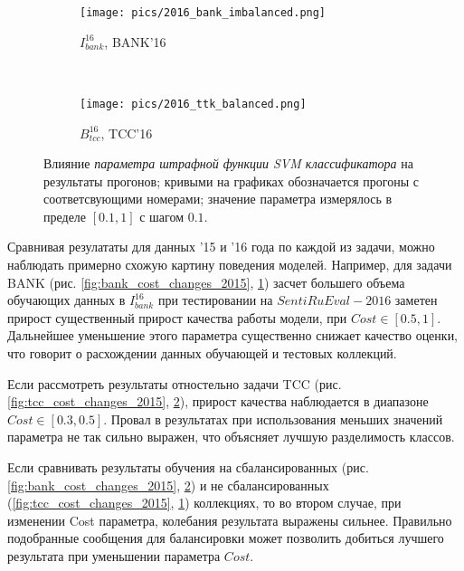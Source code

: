\begin{figure}[!htp]
    \begin{subfigure}[b]{0.45\textwidth}
        \texttt{[image: pics/2016\_bank\_imbalanced.png]}
        \caption{$I_{bank}^{16}$, BANK'16}
        \label{fig:bank_cost_changes_2016}
    \end{subfigure}
    ~
    \begin{subfigure}[b]{0.45\textwidth}
        \texttt{[image: pics/2016\_ttk\_balanced.png]}
        \caption{$B_{tcc}^{16}$, TCC'16}
        \label{fig:tcc_cost_changes_2016}
    \end{subfigure}

    \caption{
        Влияние {\it параметра штрафной функции SVM классификатора}
        на результаты прогонов;
        кривыми на графиках обозначается прогоны с соответсвующими номерами;
        значение параметра измерялось в пределе $[0.1, 1]$ с шагом $0.1$.
    }
    \label{fig:cost}
\end{figure}

Сравнивая резулататы для данных '15 и '16 года по каждой из задачи, можно
наблюдать примерно схожую картину поведения моделей. Например, для задачи
BANK (рис. \ref{fig:bank_cost_changes_2015}, \ref{fig:bank_cost_changes_2016})
засчет большего объема обучающих данных в $I_{bank}^{16}$ при тестировании на
$SentiRuEval-2016$ заметен прирост существенный прирост качества работы модели,
при $Cost \in \left[0.5, 1\right]$.
Дальнейшее уменьшение этого параметра существенно снижает качество
оценки, что говорит о расхождении данных обучающей и тестовых коллекций.

Если рассмотреть результаты отностельно задачи TCC (рис.
\ref{fig:tcc_cost_changes_2015}, \ref{fig:tcc_cost_changes_2016}),
прирост качества наблюдается в диапазоне $Cost \in [0.3, 0.5]$.
Провал в результатах при использования меньших значений параметра
не так сильно выражен, что объясняет лучшую разделимость классов.

Если сравнивать результаты обучения на сбалансированных (рис.
\ref{fig:bank_cost_changes_2015}, \ref{fig:tcc_cost_changes_2016}) и не
сбалансированных (\ref{fig:tcc_cost_changes_2015}, \ref{fig:bank_cost_changes_2016})
коллекциях, то во втором случае, при изменении Cost параметра, колебания
результата выражены сильнее. Правильно подобранные сообщения для балансировки
может позволить добиться лучшего результата при уменьшении параметра $Cost$.

